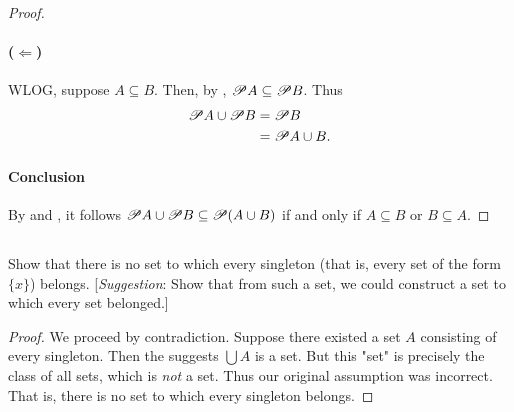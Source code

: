 \documentclass{report}
\begin{document}
\begin{proof}
    \paragraph{($\Leftarrow$)}%

      WLOG, suppose $A \subseteq B$.
      Then, by ,
        $\mathscr{P}A \subseteq \mathscr{P}B$.
      Thus
        \begin{align*}
          \mathscr{P}A \cup \mathscr{P}B
            & = \mathscr{P}B \\
            & = \mathscr{P}A \cup B.
        \end{align*}

    \paragraph{Conclusion}%

      By  and ,
        it follows
        $\mathscr{P}A \cup \mathscr{P}B \subseteq \mathscr{P}(A \cup B)$ if and
        only if $A \subseteq B$ or $B \subseteq A$.

  \end{proof}

\subsection{}%

  Show that there is no set to which every singleton (that is, every set of the
    form $\{x\}$) belongs.
  [\textit{Suggestion}: Show that from such a set, we could construct a set to
    which every set belonged.]

  \begin{proof}
    We proceed by contradiction.
    Suppose there existed a set $A$ consisting of every singleton.
    Then the  suggests $\bigcup A$ is a set.
    But this "set" is precisely the class of all sets, which is \textit{not} a
      set.
    Thus our original assumption was incorrect.
    That is, there is no set to which every singleton belongs.
  \end{proof}

\subsection{}%
\end{document}
